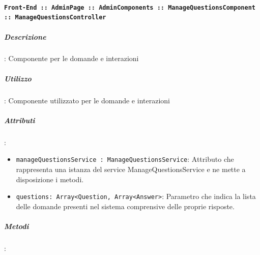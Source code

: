 \documentclass[../DefinizioneDiProdotto_v2.0.0.tex]{subfiles}
\begin{document}
			      \paragraph{\texttt{Front-End :: AdminPage :: AdminComponents :: ManageQuestionsComponent :: ManageQuestionsController}}
			      	\subparagraph{Descrizione}: Componente per le domande e interazioni
			      	\subparagraph{Utilizzo}: Componente utilizzato per le domande e interazioni
			      	\subparagraph{Attributi}:
      	      			\begin{itemize}
							\item \texttt{manageQuestionsService : ManageQuestionsService}: Attributo che rappresenta una istanza del service ManageQuestionsService e ne mette a disposizione i metodi.
							\item \texttt{questions: Array<Question, Array<Answer>}: Parametro che indica la lista delle domande presenti nel sistema comprensive delle proprie risposte.
						\end{itemize}
						\subparagraph{Metodi}:
\end{document}
